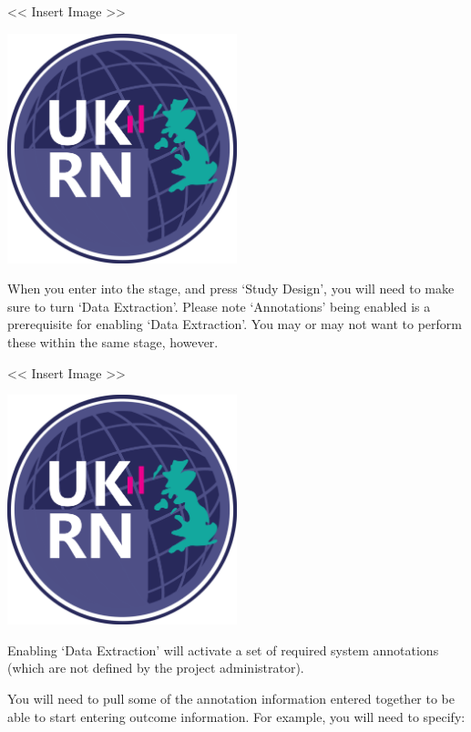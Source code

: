 \documentclass[
]{book}
\begin{document}
\textless{}\textless{} Insert Image \textgreater{}\textgreater{}

\includegraphics[width=0.5\textwidth,height=0.5\textheight]{figs/evidence-triangle.png}

When you enter into the stage, and press `Study Design', you will need to make sure to turn `Data Extraction'. Please note `Annotations' being enabled is a prerequisite for enabling `Data Extraction'. You may or may not want to perform these within the same stage, however.

\textless{}\textless{} Insert Image \textgreater{}\textgreater{}

\includegraphics[width=0.5\textwidth,height=0.5\textheight]{figs/evidence-triangle.png}

Enabling `Data Extraction' will activate a set of required system annotations (which are not defined by the project administrator).

You will need to pull some of the annotation information entered together to be able to start entering outcome information. For example, you will need to specify:
\end{document}
